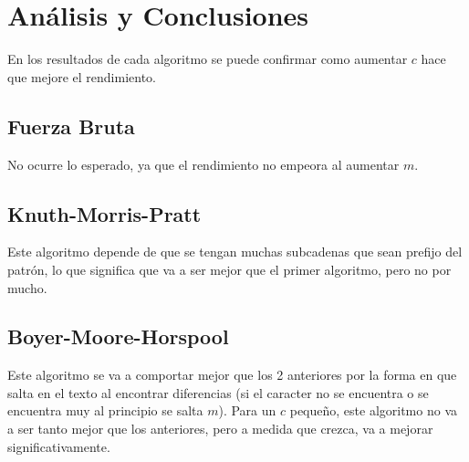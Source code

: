 \documentclass[14pt,letterpaper,hidelinks]{extarticle}
\begin{document}



\newpage
\section{Análisis y Conclusiones}
	En los resultados de cada algoritmo se puede confirmar como aumentar $c$ hace que mejore el rendimiento.
\subsection{Fuerza Bruta}
	No ocurre lo esperado, ya que el rendimiento no empeora al aumentar $m$.

\subsection{Knuth-Morris-Pratt}
	Este algoritmo depende de que se tengan muchas subcadenas que sean prefijo del patrón, lo que significa que va a ser mejor que
	el primer algoritmo, pero no por mucho.

\subsection{Boyer-Moore-Horspool}
	Este algoritmo se va a comportar mejor que los 2 anteriores por la forma en que salta en el texto
	al encontrar diferencias (si el caracter no se encuentra o se encuentra muy al principio se salta $m$).
	Para un $c$ pequeño, este algoritmo no va a ser tanto mejor que los anteriores, pero a medida que crezca,
	va a mejorar significativamente.
\end{document}
